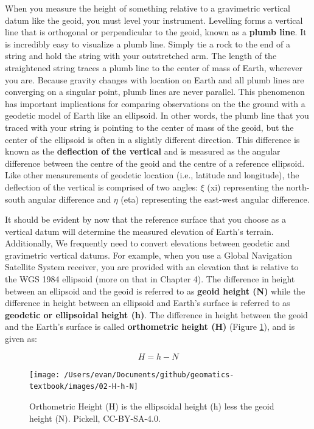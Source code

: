 \documentclass[
]{book}
\begin{document}
When you measure the height of something relative to a gravimetric vertical datum like the geoid, you must level your instrument. Levelling forms a vertical line that is orthogonal or perpendicular to the geoid, known as a \textbf{plumb line}. It is incredibly easy to visualize a plumb line. Simply tie a rock to the end of a string and hold the string with your outstretched arm. The length of the straightened string traces a plumb line to the center of mass of Earth, wherever you are. Because gravity changes with location on Earth and all plumb lines are converging on a singular point, plumb lines are never parallel. This phenomenon has important implications for comparing observations on the the ground with a geodetic model of Earth like an ellipsoid. In other words, the plumb line that you traced with your string is pointing to the center of mass of the geoid, but the center of the ellipsoid is often in a slightly different direction. This difference is known as the \textbf{deflection of the vertical} and is measured as the angular difference between the centre of the geoid and the centre of a reference ellipsoid. Like other measurements of geodetic location (i.e., latitude and longitude), the deflection of the vertical is comprised of two angles: \(ξ\) (xi) representing the north-south angular difference and \(η\) (eta) representing the east-west angular difference.

It should be evident by now that the reference surface that you choose as a vertical datum will determine the measured elevation of Earth's terrain. Additionally, We frequently need to convert elevations between geodetic and gravimetric vertical datums. For example, when you use a Global Navigation Satellite System receiver, you are provided with an elevation that is relative to the WGS 1984 ellipsoid (more on that in Chapter 4). The difference in height between an ellipsoid and the geoid is referred to as \textbf{geoid height (N)} while the difference in height between an ellipsoid and Earth's surface is referred to as \textbf{geodetic or ellipsoidal height (h)}. The difference in height between the geoid and the Earth's surface is called \textbf{orthometric height (H)} (Figure \ref{fig:2-H-h-N}), and is given as:

\[
H = h - N
\]

\begin{figure}
\texttt{[image: /Users/evan/Documents/github/geomatics-textbook/images/02-H-h-N]} \caption{Orthometric Height (H) is the ellipsoidal height (h) less the geoid height (N). Pickell, CC-BY-SA-4.0.}\label{fig:2-H-h-N}
\end{figure}
\end{document}
